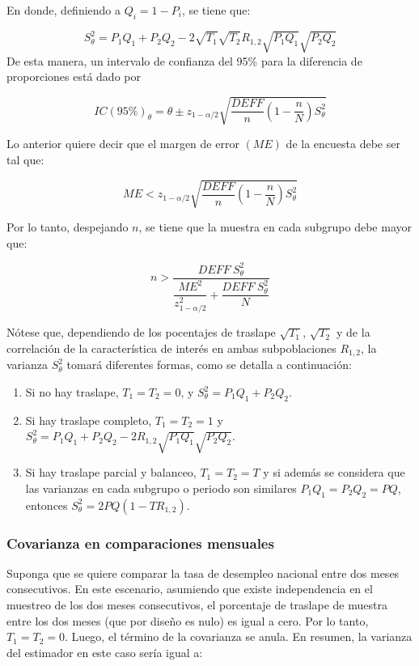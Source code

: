 \documentclass[
  12pt,
  spanish,
]{book}
\providecommand{\tightlist}{%
  \setlength{\itemsep}{0pt}\setlength{\parskip}{0pt}}
\begin{document}
En donde, definiendo a \(Q_i = 1-P_i\), se tiene que:

\[
S^2_{\theta} = P_1Q_1+P_2Q_2 - 2 \sqrt{T_1}\sqrt{T_2}R_{1,2} \sqrt{P_1Q_1}\sqrt{P_2Q_2}
\]
De esta manera, un intervalo de confianza del 95\% para la diferencia de proporciones está dado por

\[
IC(95\%)_{\theta}=\hat{\theta} \pm z_{1-\alpha/2} \sqrt{\frac{DEFF}{n}\left(1-\frac{n}{N}\right)S^2_{\theta}}
\]

Lo anterior quiere decir que el margen de error \((ME)\) de la encuesta debe ser tal que:

\[
ME < z_{1-\alpha/2} \sqrt{\frac{DEFF}{n}\left(1-\frac{n}{N}\right)S^2_{\theta}}
\]

Por lo tanto, despejando \(n\), se tiene que la muestra en cada subgrupo debe mayor que:

\[
 n> \dfrac{DEFF \ S^2_{\theta}}{\dfrac{ME^2}{z_{1-\alpha/2}^2}+\dfrac{DEFF \ S^2_{\theta}}{N}}
\]

Nótese que, dependiendo de los pocentajes de traslape \(\sqrt{T_1}\), \(\sqrt{T_2}\) y de la correlación de la característica de interés en ambas subpoblaciones \(R_{1,2}\), la varianza \(S^2_{\theta}\) tomará diferentes formas, como se detalla a continuación:

\begin{enumerate}
\def\labelenumi{\arabic{enumi}.}
\tightlist
\item
  Si no hay traslape, \(T_1 = T_2 = 0\), y \(S^2_{\theta} = P_1Q_1+P_2Q_2\).
\item
  Si hay traslape completo, \(T_1 = T_2 = 1\) y \(S^2_{\theta} = P_1Q_1+P_2Q_2 - 2 R_{1,2} \sqrt{P_1Q_1}\sqrt{P_2Q_2}\).
\item
  Si hay traslape parcial y balanceo, \(T_1 = T_2 = T\) y si además se considera que las varianzas en cada subgrupo o periodo son similares \(P_1Q_1 = P_2Q_2 = PQ\), entonces \(S^2_{\theta} = 2PQ (1- TR_{1,2})\).
\end{enumerate}

\hypertarget{covarianza-en-comparaciones-mensuales}{%
\subsubsection*{Covarianza en comparaciones mensuales}\label{covarianza-en-comparaciones-mensuales}}

Suponga que se quiere comparar la tasa de desempleo nacional entre dos meses consecutivos. En este escenario, asumiendo que existe independencia en el muestreo de los dos meses consecutivos, el porcentaje de traslape de muestra entre los dos meses (que por diseño es nulo) es igual a cero. Por lo tanto, \(T_1 = T_2 = 0\). Luego, el término de la covarianza se anula. En resumen, la varianza del estimador en este caso sería igual a:
\end{document}
